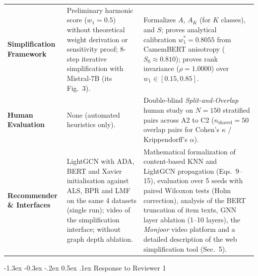 \documentclass[11pt,a4paper]{article}
\makeatletter
\newcommand{\mm}[1]{#1}
\newcommand{\mmhl}[1]{#1}
\renewcommand\section{\@startsection {section}{1}{\z@}%
  {-1.3ex \@plus -0.3ex \@minus -.2ex}%
  {0.5ex \@plus.1ex}%
  {\normalfont\large\bfseries}}
\makeatother
\begin{document}
\begin{table}[!htbp]
\begin{tabular}{>{\raggedright\arraybackslash}p{2.9cm}>{\raggedright\arraybackslash}p{5.5cm}>{\raggedright\arraybackslash}p{7.0cm}}
\addlinespace[2pt]
\textbf{Simplification Framework} & Preliminary harmonic score \mm{($w_1 = 0.5$)} without theoretical weight derivation or sensitivity proof\mm{; 8-step iterative simplification with Mistral-7B (its Fig.~3)}. & Formalizes $A$, $A_K$ (for $K$ classes), and $S$; proves analytical calibration $w_1^* = 0.8055$ from CamemBERT anisotropy ($S_0 \approx 0.810$); proves rank invariance ($\rho = 1.0000$) over $w_1 \in [0.15, 0.85]$. \\
\addlinespace[2pt]
\textbf{Human Evaluation} & None (automated heuristics only). & Double-blind \textit{Split-and-Overlap} human study on $N = 150$ stratified pairs across A2 to C2 ($n_{\text{shared}} = 50$ overlap pairs for Cohen's $\kappa$ / Krippendorff's $\alpha$). \\
\addlinespace[2pt]
\textbf{Recommender \& Interfaces} & \mm{LightGCN with ADA, BERT and Xavier initialisation against ALS, BPR and LMF on the same 4 datasets (single run); video of the simplification interface;} without graph depth ablation. & Mathematical formalization of \mm{content-based} KNN and LightGCN propagation (Eqs.\ \mmhl{9--15}), \mm{evaluation over 5 seeds with paired Wilcoxon tests (Holm correction), analysis of the BERT truncation of item texts,} GNN layer ablation (1--10 layers), \mm{the} \textit{Monjoor} video platform and \mm{a detailed description of the} web simplification tool \mm{(}Sec.\ 5\mm{)}. \\
\bottomrule
\end{tabular}
\end{table}

\medskip
\section{Response to Reviewer 1}
\end{document}
